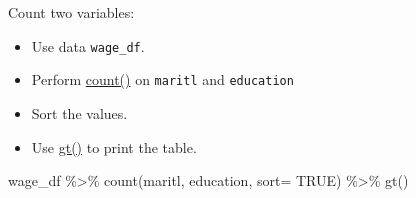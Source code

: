 \documentclass[
]{book}
\newenvironment{Shaded}{\begin{snugshade}}{\end{snugshade}}
\newcommand{\AttributeTok}[1]{\textcolor[rgb]{0.77,0.63,0.00}{#1}}
\newcommand{\ConstantTok}[1]{\textcolor[rgb]{0.00,0.00,0.00}{#1}}
\newcommand{\FunctionTok}[1]{\textcolor[rgb]{0.00,0.00,0.00}{#1}}
\newcommand{\NormalTok}[1]{#1}
\newcommand{\SpecialCharTok}[1]{\textcolor[rgb]{0.00,0.00,0.00}{#1}}
\providecommand{\tightlist}{%
  \setlength{\itemsep}{0pt}\setlength{\parskip}{0pt}}
\begin{document}
Count two variables:

\begin{itemize}
\tightlist
\item
  Use data \texttt{wage\_df}.
\item
  Perform \href{https://dplyr.tidyverse.org/reference/count.html}{count()} on \texttt{maritl} and \texttt{education}
\item
  Sort the values.
\item
  Use \href{https://gt.rstudio.com}{gt()} to print the table.
\end{itemize}

\begin{Shaded}
\begin{Highlighting}[]
\NormalTok{wage\_df }\SpecialCharTok{\%\textgreater{}\%} 
  \FunctionTok{count}\NormalTok{(maritl, education,}
        \AttributeTok{sort=} \ConstantTok{TRUE}\NormalTok{) }\SpecialCharTok{\%\textgreater{}\%} 
  \FunctionTok{gt}\NormalTok{()}
\end{Highlighting}
\end{Shaded}
\end{document}
